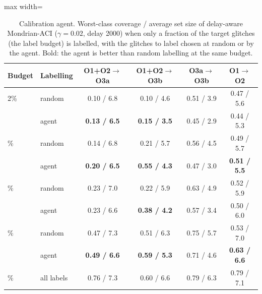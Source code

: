 \begin{table}[!htb]
\caption{Calibration agent. Worst-class coverage / average set size of delay-aware Mondrian-ACI ($\gamma=0.02$, delay 2000)
when only a fraction of the target glitches (the label budget) is labelled, with the glitches to label chosen at random or by the
agent. Bold: the agent is better than random labelling at the same budget.}\label{tab:e9}
\centering\scriptsize\setlength{\tabcolsep}{4pt}
\begin{adjustbox}{max width=\columnwidth}\begin{tabular}{llcccc}\toprule
Budget & Labelling & O1+O2$\rightarrow$O3a & O1+O2$\rightarrow$O3b & O3a$\rightarrow$O3b & O1$\rightarrow$O2\\\midrule
2\% & random & 0.10 / 6.8 & 0.10 / 4.6 & 0.51 / 3.9 & 0.47 / 5.6\\
 & agent & \textbf{0.13 / 6.5} & \textbf{0.15 / 3.5} & 0.45 / 2.9 & 0.44 / 5.3\\
\addlinespace[2pt]
5\% & random & 0.14 / 6.8 & 0.21 / 5.7 & 0.56 / 4.5 & 0.49 / 5.7\\
 & agent & \textbf{0.20 / 6.5} & \textbf{0.55 / 4.3} & 0.47 / 3.0 & \textbf{0.51 / 5.5}\\
\addlinespace[2pt]
10\% & random & 0.23 / 7.0 & 0.22 / 5.9 & 0.63 / 4.9 & 0.52 / 5.9\\
 & agent & 0.23 / 6.6 & \textbf{0.38 / 4.2} & 0.57 / 3.4 & 0.50 / 6.0\\
\addlinespace[2pt]
25\% & random & 0.47 / 7.3 & 0.51 / 6.3 & 0.75 / 5.7 & 0.53 / 7.0\\
 & agent & \textbf{0.49 / 6.6} & \textbf{0.59 / 5.3} & 0.71 / 4.6 & \textbf{0.63 / 6.6}\\
\addlinespace[2pt]
100\% & all labels & 0.76 / 7.3 & 0.60 / 6.6 & 0.79 / 6.3 & 0.79 / 7.1\\
\bottomrule
\end{tabular}\end{adjustbox}
\end{table}
